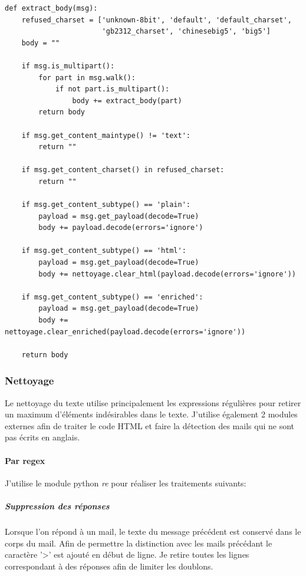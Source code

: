\documentclass[a4paper,12pt]{article}
\begin{document}
		    	\begin{lstlisting}[title=Extraction du corps du mail]
def extract_body(msg):
    refused_charset = ['unknown-8bit', 'default', 'default_charset',
                       'gb2312_charset', 'chinesebig5', 'big5']
    body = ""

    if msg.is_multipart():
        for part in msg.walk():
            if not part.is_multipart():
                body += extract_body(part)
        return body

    if msg.get_content_maintype() != 'text':
        return ""

    if msg.get_content_charset() in refused_charset:
        return ""

    if msg.get_content_subtype() == 'plain':
        payload = msg.get_payload(decode=True)
        body += payload.decode(errors='ignore')

    if msg.get_content_subtype() == 'html':
        payload = msg.get_payload(decode=True)
        body += nettoyage.clear_html(payload.decode(errors='ignore'))

    if msg.get_content_subtype() == 'enriched':
        payload = msg.get_payload(decode=True)
        body += nettoyage.clear_enriched(payload.decode(errors='ignore'))

    return body \end{lstlisting}
	    		
		\subsubsection{Nettoyage}
			Le nettoyage du texte utilise principalement les expressions régulières pour retirer un maximum d'éléments indésirables dans le texte. J'utilise également 2 modules externes afin de traiter le code HTML et faire la détection des mails qui ne sont pas écrits en anglais.
			
			\paragraph{Par regex} J'utilise le module python \emph{re} pour réaliser les traitements suivants:
			
				\subparagraph{Suppression des réponses} Lorsque l'on répond à un mail, le texte du message précédent est conservé dans le corps du mail. Afin de permettre la distinction avec les mails précédant le caractère '>' est ajouté en début de ligne. Je retire toutes les lignes correspondant à des réponses afin de limiter les doublons.
				
\end{document}

